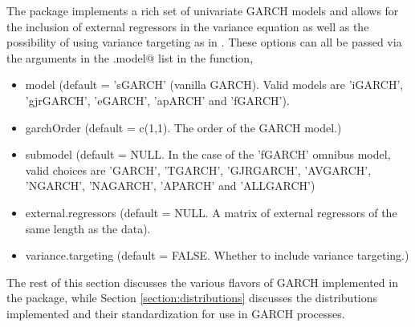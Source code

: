The \verb@rugarch@ package implements a rich set of univariate GARCH models and
allows for the inclusion of external regressors in the variance equation as well
as the possibility of using variance targeting as in \citet{EngleMezrich}.
These options can all be passed via the arguments in the \verb@variance.model@
list in the \verb@ugarchspec@ function,
\begin{itemize}
\item model			(default = 'sGARCH' (vanilla GARCH).
Valid models are 'iGARCH', 'gjrGARCH', 'eGARCH', 'apARCH' and 'fGARCH').
\item garchOrder	(default = c(1,1).  The order of the GARCH model.)
\item submodel  	(default = NULL. In the case of the 'fGARCH'
omnibus model, valid choices are 'GARCH', 'TGARCH', 'GJRGARCH', 'AVGARCH',
'NGARCH', 'NAGARCH', 'APARCH' and 'ALLGARCH')
\item external.regressors (default = NULL. A matrix of external regressors of
the same length as the data).
\item variance.targeting  (default = FALSE. Whether to include variance
targeting.)
\end{itemize}
The rest of this section discusses the various flavors of GARCH implemented in
the package, while  Section \ref{section:distributions} discusses the
distributions implemented and their standardization for use in GARCH processes.

